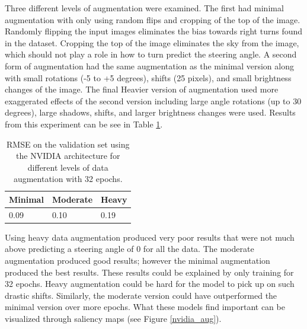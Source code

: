 \documentclass[10pt,twocolumn,letterpaper]{article}
\begin{document}
Three different levels of augmentation were examined. The first had minimal augmentation with only using random flips and cropping of the top of the image. Randomly flipping the input images eliminates the bias towards right turns found in the dataset. Cropping the top of the image eliminates the sky from the image, which should not play a role in how to turn predict the steering angle. A second form of augmentation had the same augmentation as the minimal version along with small rotations (-5 to +5 degrees), shifts (25 pixels), and small brightness changes of the image. The final Heavier version of augmentation used more exaggerated effects of the second version including large angle rotations (up to 30 degrees), large shadows, shifts, and larger brightness changes were used. Results from this experiment can be see in Table \ref{data_aug_table}.

\begin{table}[!htb]
	\centering
	\caption{RMSE on the validation set using the NVIDIA architecture for different levels of data augmentation with 32 epochs.}
	\label{data_aug_table}
	\begin{tabular}{|l|l|l|}
		\hline
		\textbf{Minimal} & \textbf{Moderate} & \textbf{Heavy} \\ \hline
		0.09             & 0.10              & 0.19           \\ \hline
	\end{tabular}
\end{table}
 
Using heavy data augmentation produced very poor results that were not much above predicting a steering angle of 0 for all the data. The moderate augmentation produced good results; however the minimal augmentation produced the best results. These results could be explained by only training for 32 epochs. Heavy augmentation could be hard for the model to pick up on such drastic shifts. Similarly, the moderate version could have outperformed the minimal version over more epochs. What these models find important can be visualized through saliency maps (see Figure \ref{nvidia_aug}). 
 
\end{document}
